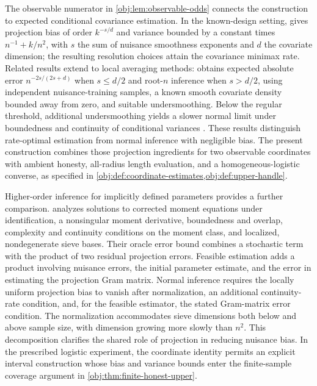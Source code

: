 \documentclass[11pt]{article}
\begin{document}
The observable numerator in \cref{obj:lem:observable-odds} connects the construction to expected conditional covariance estimation. In the known-design setting, \citet[version 5, Theorem 1 and Corollary 1]{McGrath2026} gives projection bias of order \(k^{-s/d}\) and variance bounded by a constant times \(n^{-1}+k/n^2\), with \(s\) the sum of nuisance smoothness exponents and \(d\) the covariate dimension; the resulting resolution choices attain the covariance minimax rate. Related results extend to local averaging methods: \citet[arXiv version 3, Assumption 4 and Theorem 2]{McCleanBalakrishnanKennedyWasserman2024DCDR} obtains expected absolute error \(n^{-2s/(2s+d)}\) when \(s\le d/2\) and root-\(n\) inference when \(s>d/2\), using independent nuisance-training samples, a known smooth covariate density bounded away from zero, and suitable undersmoothing. Below the regular threshold, additional undersmoothing yields a slower normal limit under boundedness and continuity of conditional variances \citep[arXiv version 3, Theorem 3]{McCleanBalakrishnanKennedyWasserman2024DCDR}. These results distinguish rate-optimal estimation from normal inference with negligible bias. The present construction combines those projection ingredients for two observable coordinates with ambient honesty, all-radius length evaluation, and a homogeneous-logistic converse, as specified in \cref{obj:def:coordinate-estimates,obj:def:upper-handle}.

Higher-order inference for implicitly defined parameters provides a further comparison. \citet[Section 3.3, Assumptions 1 and 3--9, Theorems 1--4]{ZhangLiuZhang2026GeneralTreatmentHOIF} analyzes solutions to corrected moment equations under identification, a nonsingular moment derivative, boundedness and overlap, complexity and continuity conditions on the moment class, and localized, nondegenerate sieve bases. Their oracle error bound combines a stochastic term with the product of two residual projection errors. Feasible estimation adds a product involving nuisance errors, the initial parameter estimate, and the error in estimating the projection Gram matrix. Normal inference requires the locally uniform projection bias to vanish after normalization, an additional continuity-rate condition, and, for the feasible estimator, the stated Gram-matrix error condition. The normalization accommodates sieve dimensions both below and above sample size, with dimension growing more slowly than \(n^2\). This decomposition clarifies the shared role of projection in reducing nuisance bias. In the prescribed logistic experiment, the coordinate identity permits an explicit interval construction whose bias and variance bounds enter the finite-sample coverage argument in \cref{obj:thm:finite-honest-upper}.
\end{document}
